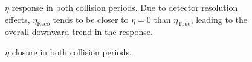 \documentclass[NOTE, atlasdraft=true, texlive=2016, USenglish]{\ATLASLATEXPATH atlasdoc}
\begin{document}
\begin{figure}[htbp]
	\centering
	\caption{$\eta$ response in both collision periods. Due to detector resolution effects, $\eta_{\text{Reco}}$ tends to be closer to $\eta = 0$ than $\eta_{\text{True}}$, leading to the overall downward trend in the response.}
	\label{fig:EtaResponse}
\end{figure}

\begin{figure}[htbp]
	\centering
	\caption{$\eta$ closure in both collision periods.}
	\label{fig:EtaClosure}
\end{figure}
\end{document}
